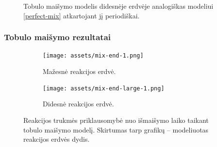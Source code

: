 \documentclass{beamer}
\begin{document}
\begin{frame}
\begin{figure}
    \caption{Tobulo maišymo modelis didesnėje erdvėje analogiškas modeliui \eqref{perfect-mix} atkartojant jį periodiškai.}
    \label{large-perfect-mix}
\end{figure}
\end{frame}

\begin{frame}
    \frametitle{Tobulo maišymo rezultatai}

    \begin{figure}
      \centering
      \begin{subfigure}[t]{0.45\linewidth}
        \texttt{[image: assets/mix-end-1.png]}
        \caption{Mažesnė reakcijos erdvė. \label{fig:perfect-small}}
      \end{subfigure}
      \hfill
      \begin{subfigure}[t]{0.45\linewidth}
        \texttt{[image: assets/mix-end-large-1.png]}
        \caption{Didesnė reakcijos erdvė. \label{fig:perfect-large}}
      \end{subfigure}
      \caption{Reakcijos trukmės priklausomybė nuo išmaišymo laiko taikant tobulo maišymo modelį. Skirtumas tarp grafikų -- modeliuotas reakcijos erdvės dydis.}
    \end{figure}
\end{frame}

\end{document}
